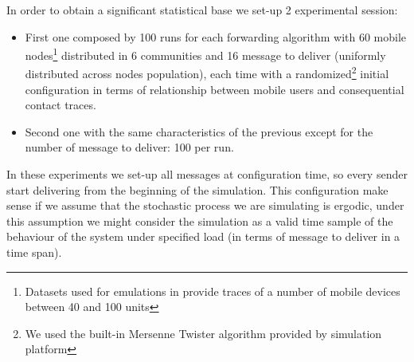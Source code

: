 In order to obtain a significant statistical base we set-up 2 experimental session:
\begin{itemize}
\item First one composed by 100 runs for each forwarding algorithm with 60 mobile nodes\footnote{Datasets used for emulations in\cite{bubble} provide traces of a number of mobile devices between 40 and 100 units} distributed in 6 communities and 16 message to deliver (uniformly distributed across nodes population), each time with a randomized\footnote{We used the built-in Mersenne Twister algorithm provided by simulation platform} initial configuration in terms of relationship between mobile users and consequential contact traces.
\item Second one with the same characteristics of the previous except for the number of message to deliver: 100 per run. 
\end{itemize} 
In these experiments we set-up all messages at configuration time, so every sender start delivering from the beginning of the simulation. This configuration make sense if we assume that the stochastic process we are simulating is ergodic, under this assumption we might consider the simulation as a valid time sample of the behaviour of the system under specified load (in terms of message to deliver in a time span).\\

